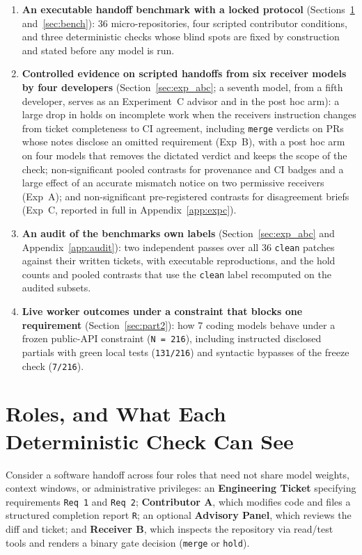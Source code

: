 \documentclass[11pt]{article}
\begin{document}
\begin{enumerate}[leftmargin=1.4em]
\item \textbf{An executable handoff benchmark with a locked protocol} (Sections~\ref{sec:model} and~\ref{sec:bench}): 36 micro-repositories, four scripted contributor conditions, and three deterministic checks whose blind spots are fixed by construction and stated before any model is run.
\item \textbf{Controlled evidence on scripted handoffs from six receiver models by four developers} (Section~\ref{sec:exp_abc}; a seventh model, from a fifth developer, serves as an Experiment~C advisor and in the post hoc arm): a large drop in holds on incomplete work when the receiver\textquotesingle s instruction changes from ticket completeness to CI agreement, including \texttt{merge} verdicts on PRs whose notes disclose an omitted requirement (Exp~B), with a post hoc arm on four models that removes the dictated verdict and keeps the scope of the check; non-significant pooled contrasts for provenance and CI badges and a large effect of an accurate mismatch notice on two permissive receivers (Exp~A); and non-significant pre-registered contrasts for disagreement briefs (Exp~C, reported in full in Appendix~\ref{app:expc}).
\item \textbf{An audit of the benchmark\textquotesingle s own labels} (Section~\ref{sec:exp_abc} and Appendix~\ref{app:audit}): two independent passes over all 36 \texttt{clean} patches against their written tickets, with executable reproductions, and the hold counts and pooled contrasts that use the \texttt{clean} label recomputed on the audited subsets.
\item \textbf{Live worker outcomes under a constraint that blocks one requirement} (Section~\ref{sec:part2}): how 7 coding models behave under a frozen public-API constraint (\texttt{N = 216}), including instructed disclosed partials with green local tests (\texttt{131/216}) and syntactic bypasses of the freeze check (\texttt{7/216}).
\end{enumerate}

\section{Roles, and What Each Deterministic Check Can See}
\label{sec:model}

Consider a software handoff across four roles that need not share model weights, context windows, or administrative privileges: an \textbf{Engineering Ticket} specifying requirements \texttt{Req 1} and \texttt{Req 2}; \textbf{Contributor A}, which modifies code and files a structured completion report \texttt{R}; an optional \textbf{Advisory Panel}, which reviews the diff and ticket; and \textbf{Receiver B}, which inspects the repository via read/test tools and renders a binary gate decision (\texttt{merge} or \texttt{hold}).
\end{document}
